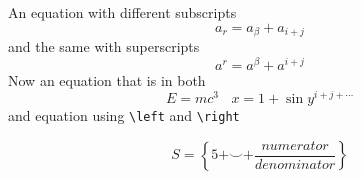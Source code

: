 \documentclass{article}
\begin{document}
An equation with different subscripts
\begin{displaymath}
a_r=a_\beta+a_{i+j}
\end{displaymath}
and the same with superscripts
\begin{displaymath}
a^r=a^\beta+a^{i+j}
\end{displaymath}
Now an equation that is in both
\begin{displaymath}
E=mc^3\ \ \ \ x=1+\sin y^{i+j+\cdots}
\end{displaymath}
and equation using \verb|\left| and \verb|\right|

\begin{displaymath}
S=\left    \{ 5+\smile+\frac{numerator}{denominator} \right \}
\end{displaymath}
\end{document}
